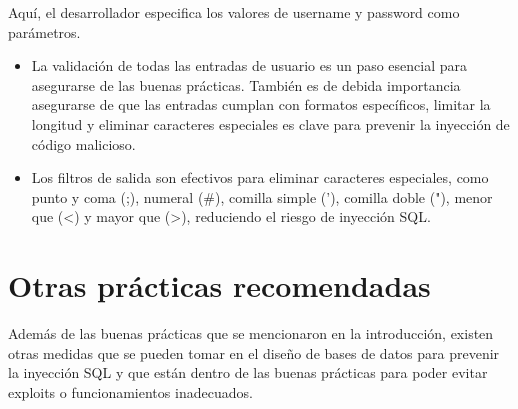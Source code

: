 \documentclass[11pt]{report}
\begin{document}
Aquí, el desarrollador especifica los valores de username y password como parámetros.
\begin{itemize}
  \item La validación de todas las entradas de usuario es un paso esencial para asegurarse de las buenas
  prácticas. También es de debida importancia asegurarse de que las entradas cumplan con formatos específicos,
  limitar la longitud y eliminar caracteres especiales es clave para prevenir la inyección de código malicioso.
  
  \item Los filtros de salida son efectivos para eliminar caracteres especiales, como punto y coma (;), numeral (\#),
  comilla simple ('), comilla doble ("), menor que (<) y mayor que (>), reduciendo el riesgo de inyección SQL.
\end{itemize}

\cleardoublepage

\section{Otras prácticas recomendadas}
Además de las buenas prácticas que se mencionaron en la introducción, existen otras medidas que se pueden tomar en
el diseño de bases de datos para prevenir la inyección SQL y que están dentro de las buenas prácticas para poder 
evitar exploits o funcionamientos inadecuados.
\end{document}
